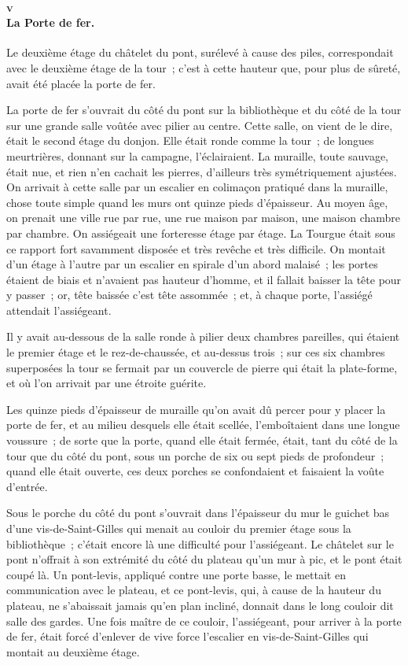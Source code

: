\documentclass[french,twoside]{book} %
\begin{document}
\paragraph[{v La Porte de fer.}]{\textsc{v} \\
La Porte de fer.}
\label{p3l2c9p5}
\noindent Le deuxième étage du châtelet du pont, surélevé à cause des piles, correspondait avec le deuxième étage de la tour ; c’est à cette hauteur que, pour plus de sûreté, avait été placée la porte de fer.\par
La porte de fer s’ouvrait du côté du pont sur la bibliothèque et du côté de la tour sur une grande salle voûtée avec pilier au centre. Cette salle, on vient de le dire, était le second étage du donjon. Elle était ronde comme la tour ; de longues meurtrières, donnant  sur la campagne, l’éclairaient. La muraille, toute sauvage, était nue, et rien n’en cachait les pierres, d’ailleurs très symétriquement ajustées. On arrivait à cette salle par un escalier en colimaçon pratiqué dans la muraille, chose toute simple quand les murs ont quinze pieds d’épaisseur. Au moyen âge, on prenait une ville rue par rue, une rue maison par maison, une maison chambre par chambre. On assiégeait une forteresse étage par étage. La Tourgue était sous ce rapport fort savamment disposée et très revêche et très difficile. On montait d’un étage à l’autre par un escalier en spirale d’un abord malaisé ; les portes étaient de biais et n’avaient pas hauteur d’homme, et il fallait baisser la tête pour y passer ; or, tête baissée c’est tête assommée ; et, à chaque porte, l’assiégé attendait l’assiégeant.\par
Il y avait au-dessous de la salle ronde à pilier deux chambres pareilles, qui étaient le premier étage et le rez-de-chaussée, et au-dessus trois ; sur ces six chambres superposées la tour se fermait par un couvercle de pierre qui était la plate-forme, et où l’on arrivait par une étroite guérite.\par
Les quinze pieds d’épaisseur de muraille qu’on avait dû percer pour y placer la porte de fer, et au milieu desquels elle était scellée, l’emboîtaient dans une longue voussure ; de sorte que la porte, quand elle était fermée, était, tant du côté de la tour que du côté du pont, sous un porche de six ou sept pieds de profondeur ; quand elle était ouverte, ces deux porches se confondaient et faisaient la voûte d’entrée.\par
 Sous le porche du côté du pont s’ouvrait dans l’épaisseur du mur le guichet bas d’une vis-de-Saint-Gilles qui menait au couloir du premier étage sous la bibliothèque ; c’était encore là une difficulté pour l’assiégeant. Le châtelet sur le pont n’offrait à son extrémité du côté du plateau qu’un mur à pic, et le pont était coupé là. Un pont-levis, appliqué contre une porte basse, le mettait en communication avec le plateau, et ce pont-levis, qui, à cause de la hauteur du plateau, ne s’abaissait jamais qu’en plan incliné, donnait dans le long couloir dit salle des gardes. Une fois maître de ce couloir, l’assiégeant, pour arriver à la porte de fer, était forcé d’enlever de vive force l’escalier en vis-de-Saint-Gilles qui montait au deuxième étage.
\end{document}
